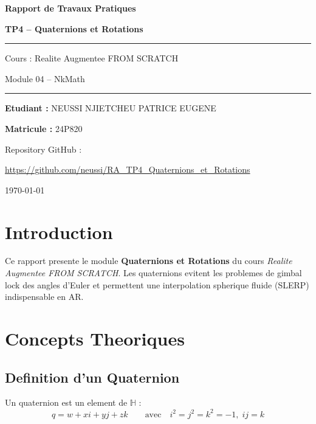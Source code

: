\documentclass[12pt,a4paper]{article}
\begin{document}
\begin{titlepage}
    \centering
    \vspace*{2cm}
    {\huge\bfseries Rapport de Travaux Pratiques\par}
    \vspace{1cm}
    {\LARGE\bfseries\color{codeblue} TP4 -- Quaternions et Rotations\par}
    \vspace{1.5cm}
    \rule{\linewidth}{0.5pt}\vspace{0.5cm}
    {\large Cours : Realite Augmentee FROM SCRATCH\par}
    {\large Module 04 -- NkMath\par}
    \vspace{0.5cm}\rule{\linewidth}{0.5pt}
    \vspace{2cm}
    {\large\textbf{Etudiant :} NEUSSI NJIETCHEU PATRICE EUGENE\par}
    {\large\textbf{Matricule :} 24P820\par}
    \vspace{2cm}
    {\large Repository GitHub :\par}
    \href{https://github.com/neussi/RA_TP4_Quaternions_et_Rotations}{https://github.com/neussi/RA\_TP4\_Quaternions\_et\_Rotations}
    \vfill
    {\large \today\par}
\end{titlepage}

\tableofcontents
\newpage

\section{Introduction}

Ce rapport presente le module \textbf{Quaternions et Rotations} du cours \textit{Realite
Augmentee FROM SCRATCH}. Les quaternions evitent les problemes de gimbal lock des angles
d'Euler et permettent une interpolation spherique fluide (SLERP) indispensable en AR.

\section{Concepts Theoriques}

\subsection{Definition d'un Quaternion}

Un quaternion est un element de $\mathbb{H}$ :
\[
    q = w + xi + yj + zk \qquad \text{avec} \quad i^2=j^2=k^2=-1,\; ij=k
\]
\end{document}
